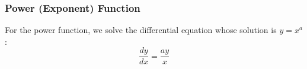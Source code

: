 \documentclass[a4paper,12pt]{article}
\begin{document}
\subsubsection*{Power (Exponent) Function}

For the power function, we solve the differential equation whose solution is $y = x^a$:
\[
\frac{dy}{dx} = \frac{ay}{x}
\]

\end{document}
